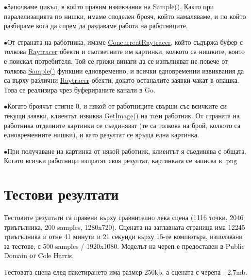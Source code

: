\documentclass[12pt]{extarticle}
\newlength{\bulletwidth}\settowidth{\bulletwidth}{$\bullet$}
\newcommand{\mitem}{\vspace{5mm}\setlength{\leftskip}{\leftmargin}\hspace*{-\labelsep}\hspace*{-\bulletwidth}$\bullet$\hspace*{\labelsep}}
\newcommand{\mend}{\setlength{\leftskip}{0cm}\vspace{5mm}}
\begin{document}
	\mitem Започваме цикъл, в който правим извиквания на \href{https://godoc.org/github.com/DexterLB/traytor/rpc#RemoteRaytracer.Sample}{Sample()}.
	Както при паралелизацията по нишки, имаме споделен брояч, който
	намаляваме, и по който разбираме кога да спрем да раздаваме
	работа на работниците.
	
	\mitem От страната на работника, имаме \href{https://godoc.org/github.com/DexterLB/traytor/rpc#ConcurrentRaytracer}{ConcurrentRaytracer},
	който съдържа буфер с толкова \href{https://godoc.org/github.com/DexterLB/traytor/raytracer#Raytracer}{Raytracer} обекти и съответните
	им картинки, колкото са нишките, които е поискал потребителя. Той
	се грижи винаги да се изпълняват не-повече от толкова
	\href{https://godoc.org/github.com/DexterLB/traytor/raytracer#Raytracer.Sample}{Sample()}
	функции едновременно, и всички едновременни извиквания да са
	върху различни \href{https://godoc.org/github.com/DexterLB/traytor/raytracer#Raytracer}{Raytracer} обекти, докато останалите
	заявки чакат в опашка. Това се реализира
	чрез буферираните канали в Go.
	
	\mitem Когато броячът стигне 0, и някой от работниците свърши
	със всичките си текущи заявки, клиентът извиква
	\href{https://godoc.org/github.com/DexterLB/traytor/rpc#RemoteRaytracerCaller.GetImage}{GetImage()}
	на този работник. От страната на работника отделните картинки
	се съединяват (те са толкова на брой, колкото са едновременните
	нишки), и като резултат се връща една картинка.
	
	\mitem При получаване на картинка от някой работник, клиентът я
	съединява с общата. Когато всички работници изпратят своя
	резултат, картинката се записва в .png

	\mend

\section{Тестови резултати}
Тестовите резултати са правени върху сравнително лека сцена (1116
точки, 2046 триъгълника, 200 samples, 1280x720).
Сцената на заглавната страница има 12245
триъгълника и отне
41 минути и 21 секунди върху 15-те компютъра, използвани за тестове,
с 500 samples / 1920x1080.
Моделът на череп е предоставен в Public Domain от Cole Harris.

Тестовата сцена след пакетирането има размер 250kb, а сцената с
черепа - 2.7mb.
\end{document}
